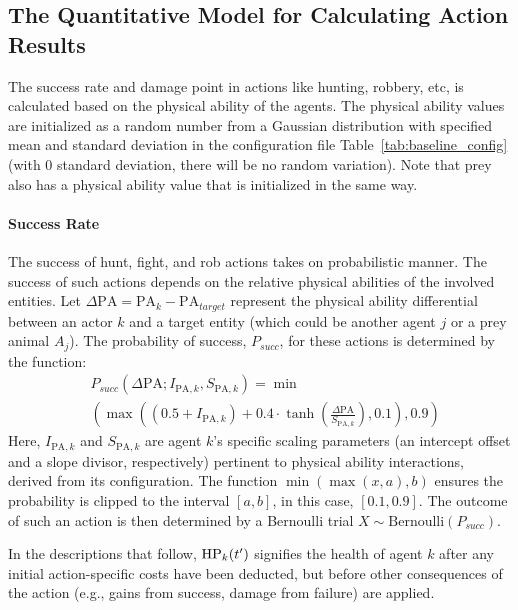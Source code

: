 \subsection{The Quantitative Model for Calculating Action Results}

The success rate and damage point in actions like hunting, robbery, etc, is calculated based on the physical ability of the agents. The physical ability values are initialized as a random number from a Gaussian distribution with specified mean and standard deviation in the configuration file Table~\ref{tab:baseline_config} (with 0 standard deviation, there will be no random variation). Note that prey also has a physical ability value that is initialized in the same way. 

\paragraph{Success Rate}
The success of hunt, fight, and rob actions takes on probabilistic manner. The success of such actions depends on the relative physical abilities of the involved entities. Let $\Delta \mathrm{PA} = \mathrm{PA}_k - \mathrm{PA}_{target}$ represent the physical ability differential between an actor $k$ and a target entity (which could be another agent $j$ or a prey animal $A_j$). The probability of success, $P_{succ}$, for these actions is determined by the function:
\begin{align*}
&P_{succ}(\Delta \mathrm{PA}; I_{\mathrm{PA},k}, S_{\mathrm{PA},k}) = \min\\&\left(\max\left((0.5 + I_{\mathrm{PA},k}) + 0.4 \cdot \tanh\left(\frac{\Delta \mathrm{PA}}{S_{\mathrm{PA},k}}\right), 0.1\right), 0.9\right)
\end{align*}
Here, $I_{\mathrm{PA},k}$ and $S_{\mathrm{PA},k}$ are agent $k$'s specific scaling parameters (an intercept offset and a slope divisor, respectively) pertinent to physical ability interactions, derived from its configuration. The function $\min(\max(x,a),b)$ ensures the probability is clipped to the interval $[a,b]$, in this case, $[0.1, 0.9]$. The outcome of such an action is then determined by a Bernoulli trial $X \sim \text{Bernoulli}(P_{succ})$.

In the descriptions that follow, $\mathrm{HP}_k(t')$ signifies the health of agent $k$ after any initial action-specific costs have been deducted, but before other consequences of the action (e.g., gains from success, damage from failure) are applied.


